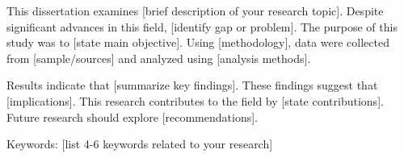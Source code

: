 This dissertation examines [brief description of your research topic]. Despite significant advances in this field, [identify gap or problem]. The purpose of this study was to [state main objective]. Using [methodology], data were collected from [sample/sources] and analyzed using [analysis methods].

Results indicate that [summarize key findings]. These findings suggest that [implications]. This research contributes to the field by [state contributions]. Future research should explore [recommendations].

Keywords: [list 4-6 keywords related to your research]
